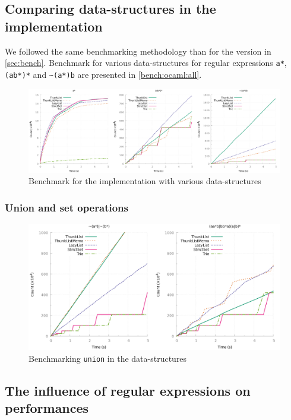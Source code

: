 \subsection{Comparing data-structures in the \ocaml implementation}

We followed the same benchmarking methodology than for the \haskell
version in \autoref{sec:bench}. Benchmark for various data-structures
for regular expressions \verb/a*/, \verb/(ab*)*/ and \verb/~(a*)b/ are
presented in \autoref{bench:ocaml:all}.

\begin{figure}[h]
  \centering
  \includegraphics[width=\linewidth]{measure/ocaml_all.png}
  \caption{Benchmark for the \ocaml implementation with various data-structures}
  \label{bench:ocaml:all}
\end{figure}

\subsubsection{Union and set operations}

\begin{figure}[h]
  \centering
  \includegraphics[width=\linewidth]{measure/ocaml_union.png}
  \caption{Benchmarking \texttt{union} in the \ocaml data-structures}
  \label{bench:ocaml:union}
\end{figure}

\subsection{The influence of regular expressions on performances}


